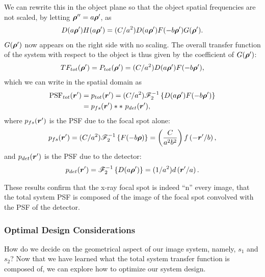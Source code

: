 \documentclass[mphy386-notes.tex]{subfiles}
\begin{document}
We can rewrite this in the object plane so that the object spatial frequencies are not
scaled, by letting $\boldsymbol{\rho}'' = a\boldsymbol{\rho}'$, as
\begin{align}
  D(a\boldsymbol{\rho}')H(a\boldsymbol{\rho}') = (C/a^2)D(a\boldsymbol{\rho}')F(-b\boldsymbol{\rho}')G(\boldsymbol{\rho}').
\end{align}
$G(\boldsymbol{\rho}')$ now appears on the right side with no scaling. The
overall transfer function of the system with respect to the object is thus given by
the coefficient of $G(\boldsymbol{\rho}')$:
\begin{align}
  TF_{tot}(\boldsymbol{\rho}') = P_{tot}(\boldsymbol{\rho}') = (C/a^2)D(a\boldsymbol{\rho}')F(-b\boldsymbol{\rho}'),
  \label{eq:TFtot}
\end{align}
which we can write in the spatial domain as
\begin{align}
  \text{PSF}_{tot}(\boldsymbol{r}') &= p_{tot}(\boldsymbol{r}') = (C/a^2)\mathscr{F}_2^{-1}\left\{D(a\boldsymbol{\rho}')F(-b\boldsymbol{\rho}')\right\}\\
                               &= p_{fs}(\boldsymbol{r}') \ast \ast \text{ }p_{det}(\boldsymbol{r}'),
\end{align}
where $p_{fs}(\boldsymbol{r}')$ is the PSF due to the focal spot alone:
\begin{align}
  p_{fs}(\boldsymbol{r}') = (C/a^2)\mathscr{F}_2^{-1}\left\{F(-b\boldsymbol{\rho})\right\} = \left(\frac{C}{a^2b^2}\right)f\left(-\boldsymbol{r}'/b\right),
  \label{eq:psffs}
\end{align}
and $p_{det}(\boldsymbol{r}')$ is the PSF due to the detector:
\begin{align}
  p_{det}(\boldsymbol{r}') = \mathscr{F}_2^{-1}\left\{D(a\boldsymbol{\rho}')\right\} = (1/a^2)d\left(\boldsymbol{r}'/a\right).
  \label{eq:psfdet}
\end{align}

These results confirm that the x-ray focal spot is indeed ``n'' every image, that the
total system PSF is composed of the image of the focal spot convolved with the PSF of the
detector.

\subsubsection{Optimal Design Considerations}

How do we decide on the geometrical aspect of our image system, namely, $s_1$ and $s_2$?  Now that
we have learned what the total system transfer function is composed of, we can explore how to optimize
our system design.
\end{document}
